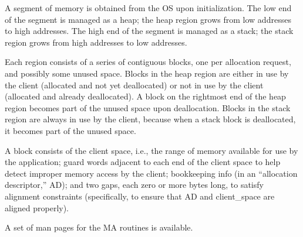 A segment of memory is obtained from the OS upon initialization.
The low end of the segment is managed as a heap; the heap region
grows from low addresses to high addresses.  The high end of the
segment is managed as a stack; the stack region grows from high
addresses to low addresses.

Each region consists of a series of contiguous blocks, one per
allocation request, and possibly some unused space.  Blocks in
the heap region are either in use by the client (allocated and
not yet deallocated) or not in use by the client (allocated and
already deallocated).  A block on the rightmost end of the heap
region becomes part of the unused space upon deallocation.
Blocks in the stack region are always in use by the client,
because when a stack block is deallocated, it becomes part of
the unused space.

A block consists of the client space, i.e., the range of memory
available for use by the application; guard words adjacent to
each end of the client space to help detect improper memory access
by the client; bookkeeping info (in an ``allocation descriptor,''
AD); and two gaps, each zero or more bytes long, to satisfy
alignment constraints (specifically, to ensure that AD and
client\_space are aligned properly).

A set of man pages for the MA routines is available.


